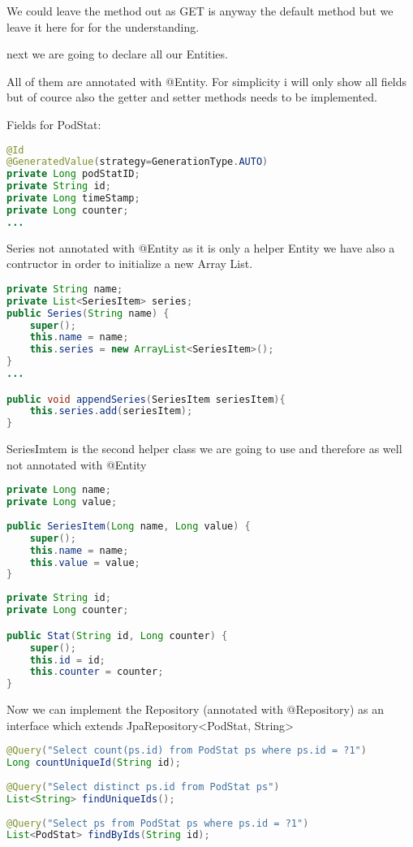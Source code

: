 We could leave the method out as GET is anyway the default method but we leave it here for for the understanding.

next we are going to declare all our Entities.

All of them are annotated with @Entity.
For simplicity i will only show all fields but of cource also the getter and setter methods needs to be implemented.

Fields for PodStat:

\begin{lstlisting}[language=Java]
@Id
@GeneratedValue(strategy=GenerationType.AUTO)
private Long podStatID;
private String id;
private Long timeStamp;
private Long counter;
...
\end{lstlisting}

Series not annotated with @Entity as it is only a helper Entity we have also a contructor in order to initialize a new Array List.
\begin{lstlisting}[language=Java]
private String name;
private List<SeriesItem> series;
public Series(String name) {
	super();
	this.name = name;
	this.series = new ArrayList<SeriesItem>();
}
...

public void appendSeries(SeriesItem seriesItem){
    this.series.add(seriesItem);
}
\end{lstlisting}

SeriesImtem is the second helper class we are going to use and therefore as well not annotated with @Entity
\begin{lstlisting}[language=Java]
private Long name;
private Long value;
	
public SeriesItem(Long name, Long value) {
	super();
	this.name = name;
	this.value = value;
}
\end{lstlisting}


\begin{lstlisting}[language=Java]
private String id;
private Long counter;

public Stat(String id, Long counter) {
	super();
	this.id = id;
	this.counter = counter;
}
\end{lstlisting}

Now we can implement the Repository (annotated with @Repository) as an interface which extends JpaRepository<PodStat, String>

\begin{lstlisting}[language=Java]
@Query("Select count(ps.id) from PodStat ps where ps.id = ?1")
Long countUniqueId(String id);
	
@Query("Select distinct ps.id from PodStat ps")
List<String> findUniqueIds();
	
@Query("Select ps from PodStat ps where ps.id = ?1")
List<PodStat> findByIds(String id);
\end{lstlisting}

